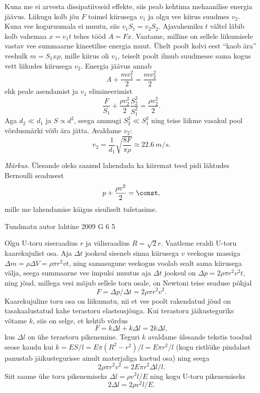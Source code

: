 \documentclass[11pt]{article}
\begin{document}
{{\ifSolution
Kuna me ei arvesta dissipatiivseid effekte, siis peab kehtima mehaanilise energia jäävus. Liikugu kolb jõu $F$ toimel kiirusega $v_1$ ja olgu vee kiirus suudmes $v_2$. Kuna vee koguruumala ei muutu, siis $v_1S_1 = v_2S_2$. Ajavahemiku $t$ vältel
läbib kolb vahemaa $x = v_1t$ tehes tööd $A = F x$. Vaatame, milline on sellele liikumisele vastav vee summaarne kineetilise energia muut. Ühelt poolt kolvi eest \enquote{kaob ära} veehulk $m = S_1x\rho$, mille kiirus oli $v_1$, teiselt poolt ilmub suudmesse sama kogus vett liikudes kiirusega $v_2$. Energia jäävus annab
\[
A+\frac{m v_{1}^{2}}{2}=\frac{m v_{2}^{2}}{2}
\]
ehk peale asendamist ja $v_1$ elimineerimist
\[
\frac{F}{S_{1}}+\frac{\rho v_{2}^{2}}{2} \frac{S_{2}^{2}}{S_{1}^{2}}=\frac{\rho v_{2}^{2}}{2}.
\]
Aga $d_2 \ll d_1$ ja $S \propto d^2$, seega ammugi $S_2^2 \ll S_1^2$ ning teise liikme vasakul pool võrdusmärki võib ära jätta. Avaldame $v_2$:
\[
v_{2}=\frac{1}{d_{1}} \sqrt{\frac{8 F}{\pi \rho}} \approx \SI{22,6}{m/s}.
\]

\emph{Märkus}. Ülesande oleks saanud lahendada ka kiiremat teed pidi lähtudes Bernoulli seadusest
\[
p+\frac{\rho v^{2}}{2}=\const,
\]
mille me lahendamise käigus sisuliselt tuletasime.
\fi
}

{Tundmatu autor} %
{lahtine} %
{2009} %
{G 6} %
{5} %
{

\ifSolution
Olgu U-toru siseraadius $r$ ja välisraadius $R = \sqrt 2 r$. Vaatleme eraldi U-toru kaarekujulist osa. Aja $\Delta t$ jooksul siseneb sinna kiirusega $v$ veekogus massiga $\Delta m = \rho \Delta V = \rho \pi r^2vt$, ning samasugune veekogus voolab sealt sama kiirusega välja, seega summaarne vee impulsi muutus aja $\Delta t$ jooksul on $\Delta p= 2\rho\pi r^2v^2 t$, ning jõud, millega vesi mõjub sellele toru osale, on Newtoni teise seaduse põhjal
\[
F=\Delta p/\Delta t= 2\rho\pi r^2v^2. 
\]
Kaarekujuline toru osa on liikumatu, nii et vee poolt rakendatud jõud on tasakaalustatud kahe terastoru elastsusjõuga. Kui terastoru jäikusteguriks võtame $k$, siis on selge, et kehtib võrdus
\[
F = k\Delta l+k\Delta l = 2k\Delta l,
\] 
kus $\Delta l$ on ühe terastoru pikenemine. Teguri $k$ avaldame ülesande tekstis toodud seose kaudu kui $k = ES/l = E\pi \left(R^2 - r^2\right)/l = E\pi r^2/l$ (kogu ristlõike pindalast panustab jäikustegurisse ainult materjaliga kaetud osa) ning seega 
\[
2\rho\pi r^2 v^2= 2E\pi r^2\Delta l/l.
\]
Siit saame ühe toru pikenemiseks $\Delta l=\rho v^2 l/E$ ning kogu U-toru pikenemiseks 
\[
2\Delta l= 2\rho v^2 l/E.
\]
\fi
}

}
\end{document}

